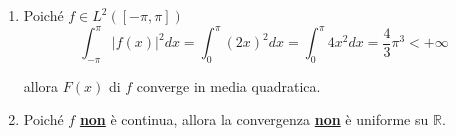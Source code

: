 \begin{enumerate}
\begin{align*}
 & \\
b_{n} & =\frac{1}{\pi }\int ^{\pi }_{-\pi } f( x)\sin( nx) dx=\frac{1}{\pi }\int ^{\pi }_{0} 2x\sin( nx) dx\\
 & \\
 & \begin{array}{ l l }
k( x) =2x & k'( x) =2\\
r( x) =-\frac{1}{n}\cos( nx) & r'( x) =\sin( nx)
\end{array}\\
 & \\
 & \overset{\text{ipp}}{=}\frac{1}{\pi }\left\{\left[ -\frac{2x}{n}\cos( nx)\right]^{\pi }_{0} +\int ^{\pi }_{0}\frac{2}{n}\cos( nx) dx\right\}\\
 & =\frac{1}{\pi }\left\{-\frac{2\pi }{n}\cos( n\pi ) +0+\left[\frac{2\sin( nx)}{n^{2}}\right]^{\pi }_{0}\right\}\\
 & =\frac{1}{\pi }\left\{-\frac{2\pi }{n}( -1)^{n}\right\} =\textcolor[rgb]{0.82,0.01,0.11}{\frac{2}{n}}\textcolor[rgb]{0.82,0.01,0.11}{(}\textcolor[rgb]{0.82,0.01,0.11}{-1}\textcolor[rgb]{0.82,0.01,0.11}{)}\textcolor[rgb]{0.82,0.01,0.11}{^{n+1}}
\end{align*}

La serie di Fourier di $f$ è\begin{equation*}
F( x) =\frac{\pi }{2} +2\sum\limits ^{\infty }_{n=1}\left[\frac{( -1)^{n} -1}{\pi n^{2}}\cos( nx) +\frac{( -1)^{n+1}}{n}\sin( nx)\right]
\end{equation*}
\item Poiché $f\in L^{2}([ -\pi ,\pi ])$\begin{equation*}
\int ^{\pi }_{-\pi }| f( x)| ^{2} dx=\int ^{\pi }_{0}( 2x)^{2} dx=\int ^{\pi }_{0} 4x^{2} dx=\frac{4}{3} \pi ^{3} < +\infty 
\end{equation*}

allora $F( x)$ di $f$ converge in media quadratica.
\item Poiché $f$ \underline{\textbf{non}} è continua, allora la convergenza \underline{\textbf{non}} è uniforme su $\mathbb{R}$.
\end{enumerate}
\Soluzione
